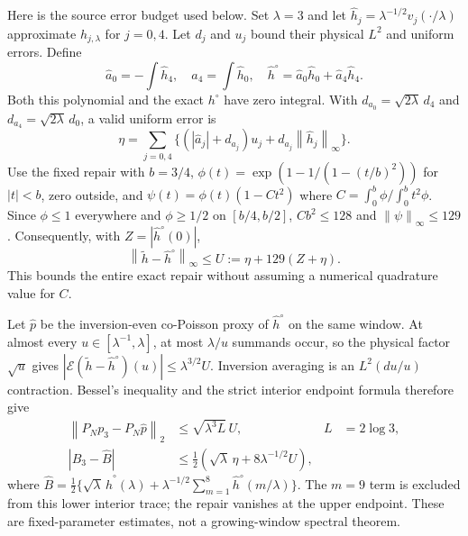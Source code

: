 \documentclass[11pt]{article}
\theoremstyle{remark}
\newcommand{\norm}[1]{\left\lVert #1\right\rVert}
\begin{document}
Here is the source error budget used below. Set $\lambda=3$ and let
$\widehat h_j=\lambda^{-1/2}v_j(\cdot/\lambda)$ approximate
$h_{j,\lambda}$ for $j=0,4$. Let $d_j$ and $u_j$ bound their physical
$L^2$ and uniform errors. Define
\[
 \widehat a_0=-\int\widehat h_4,\quad
 \widehat a_4=\int\widehat h_0,\quad
 \widehat h^\circ=\widehat a_0\widehat h_0+
                  \widehat a_4\widehat h_4.
\]
Both this polynomial and the exact $h^\circ$ have zero integral.
With $d_{a_0}=\sqrt{2\lambda}\,d_4$ and
$d_{a_4}=\sqrt{2\lambda}\,d_0$, a valid uniform error is
\begin{equation}\label{eq:v113-source-budget}
 \eta=\sum_{j=0,4}
 \{(|\widehat a_j|+d_{a_j})u_j+
                d_{a_j}\norm{\widehat h_j}_\infty\}.
\end{equation}
Use the fixed repair with $b=3/4$,
$\phi(t)=\exp(1-1/(1-(t/b)^2))$ for $|t|<b$, zero outside, and
$\psi(t)=\phi(t)(1-Ct^2)$ where
$C=\int_0^b\phi/\int_0^b t^2\phi$.
Since $\phi\le1$ everywhere and $\phi\ge1/2$ on $[b/4,b/2]$,
$Cb^2\le128$ and $\norm\psi_\infty\le129$.
Consequently, with $Z=|\widehat h^\circ(0)|$,
\begin{equation}\label{eq:v113-repair-budget}
 \norm{\widetilde h-\widehat h^\circ}_\infty
 \le U:=\eta+129(Z+\eta).
\end{equation}
This bounds the entire exact repair without assuming a numerical
quadrature value for $C$.

Let $\widehat p$ be the inversion-even co-Poisson proxy of
$\widehat h^\circ$ on the same window. At almost every
$u\in[\lambda^{-1},\lambda]$, at most $\lambda/u$ summands occur,
so the physical factor $\sqrt u$ gives
$|\mathcal E(\widetilde h-\widehat h^\circ)(u)|
 \le\lambda^{3/2}U$.
Inversion averaging is an $L^2(du/u)$ contraction. Bessel's inequality
and the strict interior endpoint formula therefore give
\begin{align}
 \norm{P_Np_3-P_N\widehat p}_2&\le\sqrt{\lambda^3L}\,U,
       &L&=2\log3,\label{eq:v113-projection-budget}\\
 |B_3-\widehat B|&\le\tfrac12\left(\sqrt\lambda\,\eta+
                                     8\lambda^{-1/2}U\right),
 \label{eq:v113-endpoint-budget}
\end{align}
where
$\widehat B=\tfrac12\{\sqrt\lambda\,\widehat h^\circ(\lambda)
+\lambda^{-1/2}\sum_{m=1}^{8}\widehat h^\circ(m/\lambda)\}$.
The $m=9$ term is excluded from this lower interior trace; the repair
vanishes at the upper endpoint. These are fixed-parameter estimates,
not a growing-window spectral theorem.
\end{document}
